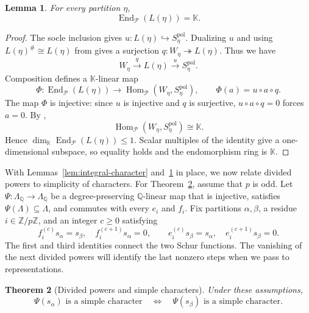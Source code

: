 \documentclass[12pt,reqno,a4paper]{amsart}
\numberwithin{equation}{section}
\numberwithin{figure}{section}
\theoremstyle{plain}
\newtheorem{theorem}{Theorem}[section]
\newtheorem{lemma}[theorem]{Lemma}
\theoremstyle{definition}
\newcommand{\cP}{\mathcal P}
\begin{document}
\begin{lemma}\label{lem:endomorphism-field}
For every partition $\eta$,
\[
\operatorname{End}_{\cP}(L(\eta))=\mathbb K.
\]
\end{lemma}

\begin{proof}
The socle inclusion gives $u:L(\eta)\hookrightarrow
S_\eta^{\mathrm{pol}}$.  Dualizing $u$ and using
$L(\eta)^\#\cong L(\eta)$ from \cite[Theorem~2(ii)]{HTY} gives
a surjection $q:W_\eta\twoheadrightarrow L(\eta)$.  Thus we have
\[
W_\eta\xrightarrow{q}L(\eta)\xrightarrow{u}S_\eta^{\mathrm{pol}}.
\]
Composition defines a $\mathbb K$-linear map
\[
\Phi:\operatorname{End}_{\cP}(L(\eta))
 \longrightarrow
 \operatorname{Hom}_{\cP}(W_\eta,S_\eta^{\mathrm{pol}}),
\qquad
\Phi(a)=u\circ a\circ q.
\]
The map $\Phi$ is injective: since $u$ is injective and $q$ is
surjective, $u\circ a\circ q=0$ forces $a=0$.
By \cite[Theorem~2(iv)]{HTY},
\[
\operatorname{Hom}_{\cP}(W_\eta,S_\eta^{\mathrm{pol}})\cong\mathbb K.
\]
Hence $\dim_{\mathbb K}\operatorname{End}_{\cP}(L(\eta))\leq1$.  Scalar
multiples of the identity give a one-dimensional subspace, so equality
holds and the endomorphism ring is $\mathbb K$.
\end{proof}

With Lemmas~\ref{lem:integral-character} and~\ref{lem:endomorphism-field}
in place, we now relate divided powers to simplicity of characters.
For Theorem~\ref{thm:divided-power-simple-characters}, assume that
$p$ is odd.  Let $\Psi:\Lambda_{\mathbb Q}\to\Lambda_{\mathbb Q}$ be a
degree-preserving $\mathbb Q$-linear map that is injective,
satisfies $\Psi(\Lambda)\subseteq\Lambda$, and commutes with every
$e_i$ and $f_i$.  Fix partitions $\alpha,\beta$, a residue
$i\in\mathbb Z/p\mathbb Z$, and an integer $c\geq0$ satisfying
\begin{equation}\label{eq:extremal-string-identities}
f_i^{(c)}s_\alpha=s_\beta,\quad
f_i^{(c+1)}s_\alpha=0,\qquad
e_i^{(c)}s_\beta=s_\alpha,\quad
e_i^{(c+1)}s_\beta=0.
\end{equation}
The first and third identities connect the two Schur functions.
The vanishing of the next divided powers will identify the last
nonzero steps when we pass to representations.

\begin{theorem}[Divided powers and simple characters]
\label{thm:divided-power-simple-characters}
Under these assumptions,
\begin{equation}\label{eq:divided-power-simplicity}
\Psi(s_\alpha)\text{ is a simple character}
\quad\Longleftrightarrow\quad
\Psi(s_\beta)\text{ is a simple character}.
\end{equation}
\end{theorem}
\end{document}
